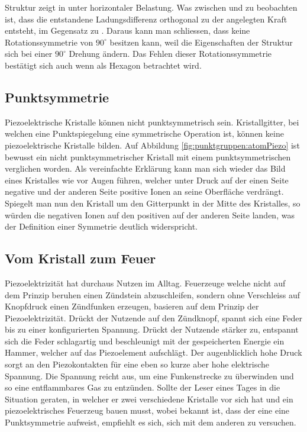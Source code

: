 Struktur  zeigt  in unter horizontaler Belastung.
Was zwischen  und  zu beobachten ist, dass die entstandene Ladungsdifferenz orthogonal zu der angelegten Kraft entsteht, im Gegensatz zu .
Daraus kann man schliessen, dass  keine Rotationssymmetrie von \(90^\circ\) besitzen kann, weil die Eigenschaften der Struktur sich bei einer \(90^\circ\) Drehung ändern.
Das Fehlen dieser Rotationssymmetrie bestätigt sich auch wenn  als Hexagon betrachtet wird.
 

\subsection{Punktsymmetrie}

Piezoelektrische Kristalle können nicht punktsymmetrisch sein.
Kristallgitter, bei welchen eine Punktspiegelung eine symmetrische Operation ist, können keine piezoelektrische Kristalle bilden.
Auf Abbildung \ref{fig:punktgruppen:atomPiezo} ist bewusst  ein nicht punktsymmetrischer Kristall mit einem punktsymmetrischen  verglichen worden.
Als vereinfachte Erklärung kann man sich wieder das Bild eines Kristalles wie  vor Augen führen, welcher unter Druck auf der einen Seite negative und der anderen Seite positive Ionen an seine Oberfläche verdrängt.
Spiegelt man nun den Kristall um den Gitterpunkt in der Mitte des Kristalles, so würden die negativen Ionen auf den positiven auf der anderen Seite landen, was der Definition einer Symmetrie deutlich widerspricht.


\subsection{Vom Kristall zum Feuer}

Piezoelektrizität hat durchaus Nutzen im Alltag.
Feuerzeuge welche nicht auf dem Prinzip beruhen einen Zündstein abzuschleifen, sondern ohne Verschleiss auf Knopfdruck einen Zündfunken erzeugen, basieren auf dem Prinzip der Piezoelektrizität.
Drückt der Nutzende auf den Zündknopf, spannt sich eine Feder bis zu einer konfigurierten Spannung.
Drückt der Nutzende stärker zu, entspannt sich die Feder schlagartig und beschleunigt mit der gespeicherten Energie ein Hammer, welcher auf das Piezoelement aufschlägt.
Der augenblicklich hohe Druck sorgt an den Piezokontakten für eine eben so kurze aber hohe elektrische Spannung.
Die Spannung reicht aus, um eine Funkenstrecke zu überwinden und so eine entflammbares Gas zu entzünden.
Sollte der Leser eines Tages in die Situation geraten, in welcher er zwei verschiedene Kristalle vor sich hat und ein piezoelektrisches Feuerzeug bauen musst, wobei bekannt ist, dass der eine eine Punktsymmetrie aufweist, empfiehlt es sich, sich mit dem anderen zu versuchen.

